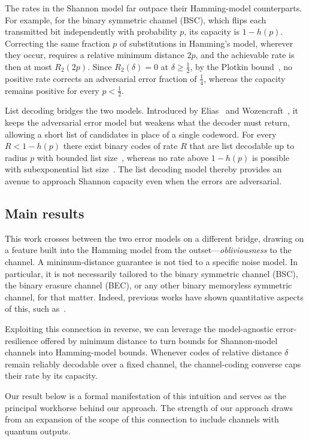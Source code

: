 \documentclass[11pt]{article}
\renewcommand{\geq}{\geqslant}
\theoremstyle{remark}
\begin{document}
The rates in the Shannon model far outpace their Hamming-model counterparts. For example, for the binary symmetric channel (BSC), which flips each transmitted bit independently with probability $p$, its capacity is $1-h(p)$. Correcting the same fraction $p$ of substitutions in Hamming's model, wherever they occur, requires a relative minimum distance $2p$, and the achievable rate is then at most $R_2(2p)$. Since $R_2(\delta) = 0$ at $\delta \geq \frac{1}{2}$, by the Plotkin bound~\cite{Plo60}, no positive rate corrects an adversarial error fraction of $\frac{1}{4}$, whereas the capacity remains positive for every $p < \frac{1}{2}$.

List decoding bridges the two models. Introduced by Elias~\cite{Eli57} and Wozencraft~\cite{Woz58}, it keeps the adversarial error model but weakens what the decoder must return, allowing a short list of candidates in place of a single codeword. For every $R < 1-h(p)$ there exist binary codes of rate $R$ that are list decodable up to radius $p$ with bounded list size~\cite{ZP81,Eli91}, whereas no rate above $1-h(p)$ is possible with subexponential list size~\cite{Gur04}. The list decoding model thereby provides an avenue to approach Shannon capacity even when the errors are adversarial.

\bigskip

\subsection{Main results}
\label{subsec:main-results}

This work crosses between the two error models on a different bridge, drawing on a feature built into the Hamming model from the outset---\emph{obliviousness} to the channel. A minimum-distance guarantee is not tied to a specific noise model. In particular, it is not necessarily tailored to the binary symmetric channel (BSC), the binary erasure channel (BEC), or any other binary memoryless symmetric channel, for that matter. Indeed, previous works have shown quantitative aspects of this, such as~\cite{TZ00,HSS21,PSW24,KYH26}.

Exploiting this connection in reverse, we can leverage the model-agnostic error-resilience offered by minimum distance to turn bounds for Shannon-model channels into Hamming-model bounds. Whenever codes of relative distance $\delta$ remain reliably decodable over a fixed channel, the channel-coding converse caps their rate by its capacity.

Our result below is a formal manifestation of this intuition and serves as the principal workhorse behind our approach. The strength of our approach draws from an expansion of the scope of this connection to include channels with quantum outputs.
\end{document}
